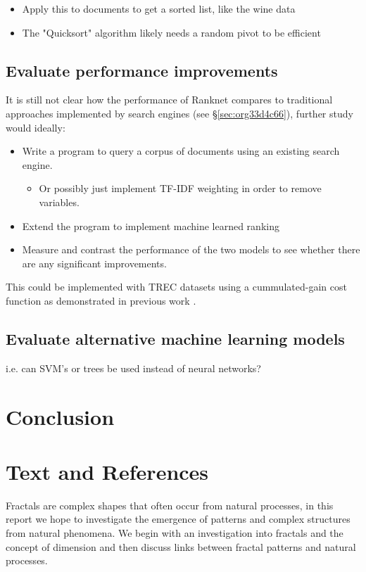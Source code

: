 \documentclass[a4paper,11pt,twoside]{article}
\begin{document}
\begin{itemize}
\item Apply this to documents to get a sorted list, like the wine data
\item The "Quicksort" algorithm likely needs a random pivot to be efficient \cite{timroughgardenQuicksortOverview2017}
\end{itemize}

\subsection{Evaluate performance improvements}
\label{sec:org01002d0}

It is still not clear how the
performance of Ranknet compares to traditional approaches
implemented by search engines (see \S \ref{sec:org33d4c66}), further
study would ideally:

\begin{itemize}
\item Write a program to query a corpus of documents using an existing search engine.
\begin{itemize}
\item Or possibly just implement TF-IDF weighting in order to remove variables.
\end{itemize}
\item Extend the program to implement machine learned ranking
\item Measure and contrast the performance of the two models to see
whether there are any significant improvements.
\end{itemize}

This could be implemented with TREC datasets
\cite{usnationalinstituteofstandardsandtechnologyTextREtrievalConference}
using a cummulated-gain cost function
\cite{jarvelinCumulatedGainbasedEvaluation2002} as demonstrated in
previous work \cite{viksinghComparisonOpenSource2009}.

\subsection{Evaluate alternative machine learning models}
\label{sec:org6c568c4}
i.e. can SVM's or trees be used instead of neural networks?

\section{Conclusion}
\label{sec:org394554b}

\section{Text and References}
\label{sec:org8b67e40}
Fractals are complex shapes that often occur from natural processes, in this
report we hope to investigate the emergence of patterns and complex structures
from natural phenomena. We begin with an investigation into fractals and the
concept of dimension and then discuss links between fractal patterns and natural
processes.
\end{document}
